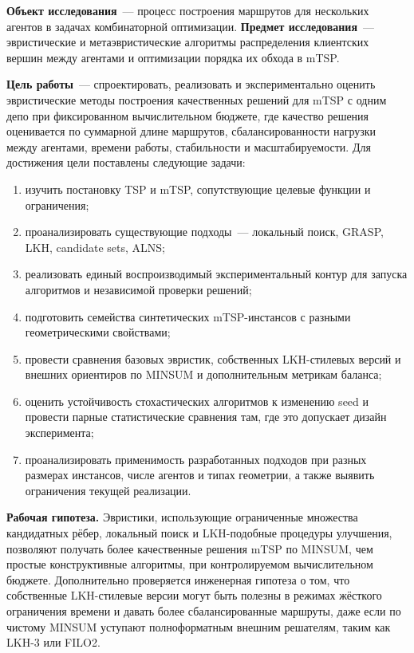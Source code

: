 \documentclass[14pt,a4paper]{extarticle}
\begin{document}
\textbf{Объект исследования}~--- процесс построения маршрутов для нескольких агентов в задачах комбинаторной оптимизации. \textbf{Предмет исследования}~--- эвристические и метаэвристические алгоритмы распределения клиентских вершин между агентами и оптимизации порядка их обхода в mTSP.

\textbf{Цель работы}~--- спроектировать, реализовать и экспериментально оценить эвристические методы построения качественных решений для mTSP с одним депо при фиксированном вычислительном бюджете, где качество решения оценивается по суммарной длине маршрутов, сбалансированности нагрузки между агентами, времени работы, стабильности и масштабируемости. Для достижения цели поставлены следующие задачи:
\begin{enumerate}
  \item изучить постановку TSP и mTSP, сопутствующие целевые функции и ограничения;
  \item проанализировать существующие подходы~--- локальный поиск, GRASP, LKH, candidate sets, ALNS;
  \item реализовать единый воспроизводимый экспериментальный контур для запуска алгоритмов и независимой проверки решений;
  \item подготовить семейства синтетических mTSP-инстансов с разными геометрическими свойствами;
  \item провести сравнения базовых эвристик, собственных LKH-стилевых версий и внешних ориентиров по MINSUM и дополнительным метрикам баланса;
  \item оценить устойчивость стохастических алгоритмов к изменению seed и провести парные статистические сравнения там, где это допускает дизайн эксперимента;
  \item проанализировать применимость разработанных подходов при разных размерах инстансов, числе агентов и типах геометрии, а также выявить ограничения текущей реализации.
\end{enumerate}

\textbf{Рабочая гипотеза.} Эвристики, использующие ограниченные множества кандидатных рёбер, локальный поиск и LKH-подобные процедуры улучшения, позволяют получать более качественные решения mTSP по MINSUM, чем простые конструктивные алгоритмы, при контролируемом вычислительном бюджете. Дополнительно проверяется инженерная гипотеза о том, что собственные LKH-стилевые версии могут быть полезны в режимах жёсткого ограничения времени и давать более сбалансированные маршруты, даже если по чистому MINSUM уступают полноформатным внешним решателям, таким как LKH-3 или FILO2.
\end{document}

